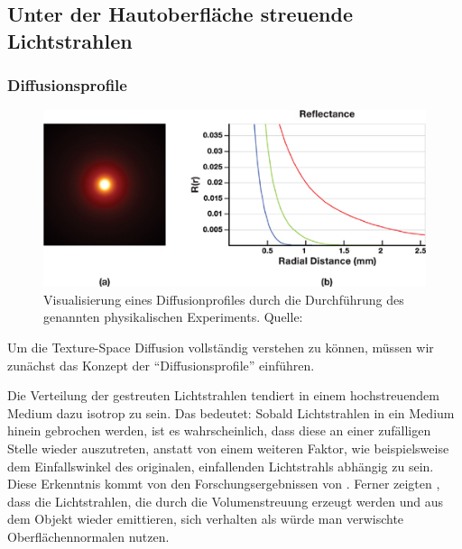 \documentclass[ngerman,runningheads,a4paper]{llncs}[2018/03/10]
\begin{document}
\subsection{Unter der Hautoberfläche streuende Lichtstrahlen}
\label{sub:skin-subsurface-reflect}

\subsubsection{Diffusionsprofile}
\label{sub:diffusion-profiles}

\begin{figure}
  \centering
  \includegraphics[scale=0.7,keepaspectratio]{./images/diffusion-profile-visualization}
  \caption{Visualisierung eines Diffusionprofiles durch die Durchführung des genannten physikalischen Experiments. Quelle: \cite{advanced-realtime-skin-rendering}}
  \label{fig:diffusion-profile-experiment}
\end{figure}

Um die Texture-Space Diffusion vollständig verstehen zu können, müssen wir zunächst das Konzept der \enquote{Diffusionsprofile} einführen.

Die Verteilung der gestreuten Lichtstrahlen tendiert in einem hochstreuendem Medium dazu isotrop zu sein.
Das bedeutet: Sobald Lichtstrahlen in ein Medium hinein gebrochen werden, ist es wahrscheinlich, dass diese an einer zufälligen Stelle wieder auszutreten, anstatt von einem weiteren Faktor, wie beispielsweise dem Einfallswinkel des originalen, einfallenden Lichtstrahls abhängig zu sein. \cite{hoffman2013background}
Diese Erkenntnis kommt von den Forschungsergebnissen von \citet{stam1995multiple}.
Ferner zeigten \citet{ma2007rapid}, dass die Lichtstrahlen, die durch die Volumenstreuung erzeugt werden und aus dem Objekt wieder emittieren, sich verhalten als würde man verwischte Oberflächennormalen nutzen.
\end{document}
